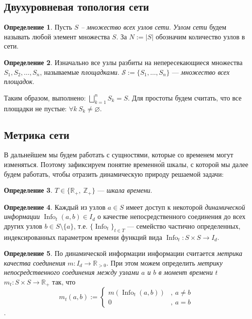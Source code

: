 \documentclass{article}
\theoremstyle{plain}
\theoremstyle{plain}
\theoremstyle{plain}
\theoremstyle{plain}
\theoremstyle{definition}
\newtheorem{definition}{Определение}[section]
\theoremstyle{remark}
\theoremstyle{plain}
\DeclareMathOperator*{\info}{Info}
\begin{document}
\subsection{Двухуровневая топология сети}

\begin{definition}
    Пусть \textit{$S$ – множество всех узлов сети}. \textit{Узлом сети} будем называть любой элемент множества $S$. За $N := |S|$ обозначим количество узлов в сети.
\end{definition}

\begin{definition}
    Изначально все узлы разбиты на непересекающиеся множества $S_1, S_2, \ldots, S_n$, называемые \textit{площадками}. $\mathcal{S} := \{S_1, \ldots, S_n\}$ --- \textit{множество всех площадок}.
\end{definition}

Таким образом, выполнено: $\displaystyle \bigsqcup_{k = 1}^n S_k = S$. Для простоты будем считать, что все площадки не пустые: $\forall k\ S_k \neq \varnothing$.

\subsection{Метрика сети}
\label{MetricSubsection}

В дальнейшем мы будем работать с сущностями, которые со временем могут изменяться. Поэтому зафиксируем понятие временн\'{о}й шкалы, с которой мы далее будем работать, чтобы отразить динамическую природу решаемой задачи:

\begin{definition}
    $T \in \{\mathbb{R}_+,\ \mathbb{Z}_+\}$ --- \textit{шкала времени}.
\end{definition}

\begin{definition}
    Каждый из узлов $a \in S$ имеет доступ к некоторой \textit{динамической информации} $\info_t(a, b) \in I_d$ о качестве непосредственного соединения до всех других узлов $b \in S \setminus \{a\}$, т.е. $\{\info_t\}_{t \in T}$ --- семейство частично определенных, индексированных параметром времени функций вида $\info_t: S \times S \to I_d$.
\end{definition}

\begin{definition}
\label{MetricDefinition}
    По динамической информации информации считается \textit{метрика качества соединения} $m: I_d \to \mathbb{R}_{>0}$. При этом можем определить \textit{метрику непосредственного соединения между узлами $a$ и $b$ в момент времени $t$} $m_t: S \times S \to \mathbb{R}_+$ так, что
    \[ m_t(a, b) :=
      \begin{cases}
        m(\info_t(a, b)) &,\ a \neq b \\
        0 &,\ a = b
      \end{cases}
    \].
\end{definition}
\end{document}

